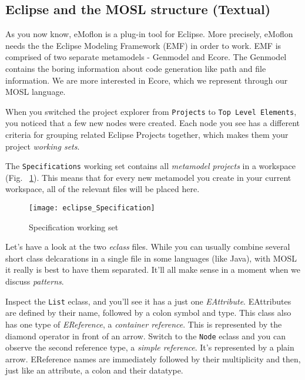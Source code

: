 \newpage
\texHeader

\subsection{Eclipse and the MOSL structure (Textual)}

As\hypertarget{projectStructure tex}{} you now know, eMoflon is a plug-in tool for Eclipse. More precisely, eMoflon needs the the Eclipse Modeling Framework
(EMF) in order to work. EMF is comprised of two separate metamodels - Genmodel and Ecore. The Genmodel contains the boring information about code generation
like path and file information. We are more interested in Ecore, which we represent through our MOSL language.

When you switched the project explorer from \texttt{Projects} to \texttt{Top Level Elements}, you noticed that a few new nodes were created. Each node you see
has a different criteria for grouping related Eclipse Projects together, which makes them your project \emph{working sets}.

The \texttt{Specifications} working set contains all \emph{metamodel projects} in a workspace (Fig. ~\ref{fig_modelSpecification}). This means that for every
new metamodel you create in your current workspace, all of the relevant files will be placed here.

 \begin{figure}[htbp]
  \centering
  \texttt{[image: eclipse\_Specification]}
  \caption{Specification working set}
  \label{fig_modelSpecification}
\end{figure}
  

Let's have a look at the two \emph{eclass} files. While you can usually combine several short class delcarations in a single file in some languages (like Java),
with MOSL it really is best to have them separated. It'll all make sense in a moment when we discuss \emph{patterns}.

Inspect the \texttt{List} eclass, and you'll see it has a just one \emph{EAttribute}. EAttributes are defined by their name, followed by a colon symbol and
type. This class also has one type of \emph{EReference}, a \emph{container reference}. This is represented by the diamond operator in front of an arrow. Switch
to the \texttt{Node} eclass and you can observe the second reference type, a \emph{simple reference}. It's represented by a plain arrow. EReference names are
immediately followed by their multiplicity and then, just like an attribute, a colon and their datatype.


